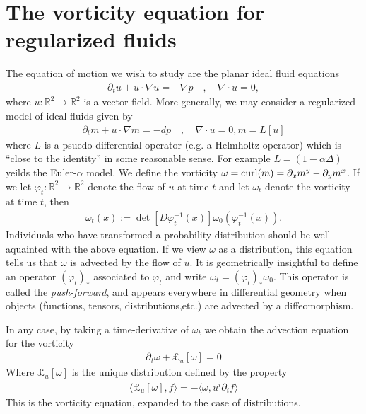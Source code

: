\documentclass[12pt]{amsart}
\newcommand{\R}{\ensuremath{\mathbb{R}}}
\begin{document}
\section{The vorticity equation for regularized fluids}
\label{sec:vorticity}
The equation of motion we wish to study are the planar ideal fluid equations
\begin{align*}
  \partial_t u + u \cdot \nabla u = - \nabla p \quad, \quad \nabla \cdot u = 0,
\end{align*}
where $u:\R^2 \to \R^2$ is a vector field.
More generally, we may consider a regularized model of ideal fluids given by
\begin{align*}
  \partial_t m + u \cdot \nabla m = - dp \quad,\quad \nabla \cdot u = 0, m = L[u]
\end{align*}
where $L$ is a psuedo-differential operator (e.g. a Helmholtz operator)
which is ``close to the identity'' in some reasonable sense.
For example $L = (1-\alpha \Delta)$ yeilds the Euler-$\alpha$ model.
We define the vorticity $\omega = {\rm curl}(m) = \partial_x m^y - \partial_y m^x$.
If we let $\varphi_t : \R^2 \to \R^2$ denote the flow of $u$ at time $t$
and let $\omega_t$ denote the vorticity at time $t$, then
\begin{align*}
  \omega_t (x):= \det[ D\varphi_t^{-1}(x) ] \omega_0(\varphi_t^{-1}(x)).
\end{align*}
Individuals who have transformed a probability distribution should be well aquainted with the above
equation.
If we view $\omega$ as a distribution,
this equation tells us that $\omega$ is advected by the flow of $u$.
It is geometrically insightful to define an operator $(\varphi_t)_*$
associated to $\varphi_t$ and write $\omega_t = (\varphi_t)_* \omega_0$.
This operator is called the \emph{push-forward}, and appears everywhere in differential geometry
when objects (functions, tensors, distributions,etc.) are advected by a diffeomorphism.

In any case, by taking a time-derivative of $\omega_t$ we obtain the advection equation for the vorticity
\begin{align*}
  \partial_t \omega + \pounds_u [\omega] = 0
\end{align*}
Where $\pounds_u[\omega]$ is the unique distribution defined by the property
\begin{align*}
  \langle \pounds_u[\omega] , f \rangle = - \langle \omega , u^i \partial_i f \rangle
\end{align*}
This is the vorticity equation, expanded to the case of distributions.
\end{document}
